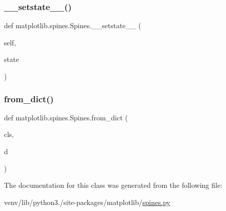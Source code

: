 \mbox{\label{classmatplotlib_1_1spines_1_1Spines_a55614fa7681ed17908ff5cf3efe605c0}} 
\subsubsection{\texorpdfstring{\+\_\+\+\_\+setstate\+\_\+\+\_\+()}{\_\_setstate\_\_()}}
{\footnotesize\ttfamily def matplotlib.\+spines.\+Spines.\+\_\+\+\_\+setstate\+\_\+\+\_\+ (\begin{DoxyParamCaption}\item[{}]{self,  }\item[{}]{state }\end{DoxyParamCaption})}

\mbox{\label{classmatplotlib_1_1spines_1_1Spines_a1e8c091dfda1d51deb167542833e46b0}} 
\subsubsection{\texorpdfstring{from\+\_\+dict()}{from\_dict()}}
{\footnotesize\ttfamily def matplotlib.\+spines.\+Spines.\+from\+\_\+dict (\begin{DoxyParamCaption}\item[{}]{cls,  }\item[{}]{d }\end{DoxyParamCaption})}



The documentation for this class was generated from the following file\+:\begin{DoxyCompactItemize}
\item 
venv/lib/python3./site-\/packages/matplotlib/\hyperlink{spines_8py}{spines.\+py}\end{DoxyCompactItemize}
